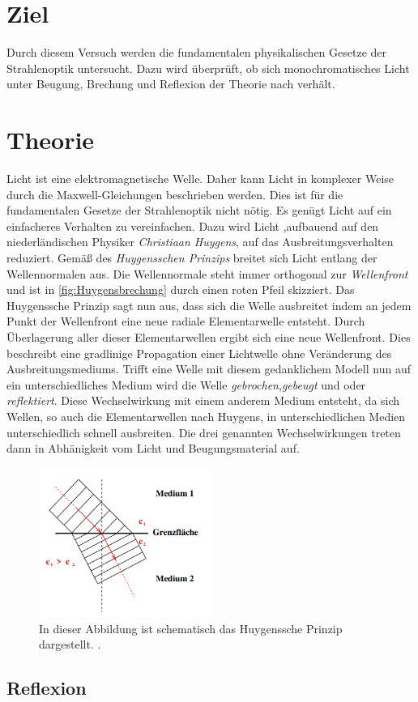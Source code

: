 \section{Ziel}
\label{sec:Ziel}
Durch diesem Versuch werden die fundamentalen physikalischen Gesetze der Strahlenoptik untersucht. Dazu wird überprüft, ob sich monochromatisches Licht unter Beugung, Brechung 
und Reflexion der Theorie nach verhält.

\section{Theorie}
\label{sec:Theorie}
Licht ist eine elektromagnetische Welle. Daher kann Licht in komplexer Weise durch die Maxwell-Gleichungen beschrieben werden. Dies ist für die fundamentalen Gesetze der
Strahlenoptik nicht nötig. Es genügt Licht auf ein einfacheres Verhalten zu vereinfachen. Dazu wird Licht ,aufbauend auf den niederländischen Physiker 
\textit{Christiaan Huygens}, auf das Ausbreitungsverhalten reduziert. Gemäß des \textit{Huygensschen Prinzips} breitet sich Licht entlang der Wellennormalen aus. Die 
Wellennormale steht immer orthogonal zur \textit{Wellenfront} und ist in \autoref{fig:Huygensbrechung} durch einen roten Pfeil skizziert. Das Huygenssche Prinzip sagt nun aus,
dass sich die Welle ausbreitet indem an jedem Punkt der Wellenfront eine neue radiale Elementarwelle entsteht. Durch Überlagerung aller dieser Elementarwellen ergibt sich 
eine neue Wellenfront. Dies beschreibt eine gradlinige Propagation einer Lichtwelle ohne Veränderung des Ausbreitungsmediums. Trifft eine Welle mit diesem gedanklichem Modell
nun auf ein unterschiedliches Medium wird die Welle \textit{gebrochen},\textit{gebeugt} und oder \textit{reflektiert}. Diese Wechselwirkung mit einem anderem Medium entsteht, 
da sich Wellen, so auch die Elementarwellen nach Huygens, in unterschiedlichen Medien unterschiedlich schnell ausbreiten. Die drei genannten Wechselwirkungen treten dann in 
Abhänigkeit vom Licht und Beugungsmaterial auf. 

\begin{figure}
    \centering
    \includegraphics[width=0.5\textwidth]{content/HuygensscheBrechung.png}
    \caption{In dieser Abbildung ist schematisch das Huygenssche Prinzip dargestellt. \cite{v400}.}
    \label{fig:Huygensbrechung}
  \end{figure}

\subsection{Reflexion}
\label{subsec:reflexion}
